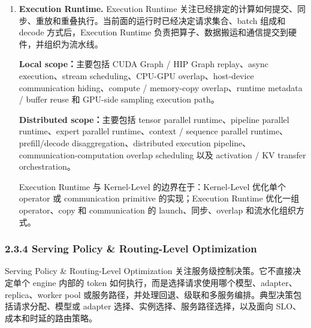 \begin{enumerate}
    \textbf{Distributed scope：}Decoding Runtime 会涉及 distributed verification、draft / target execution split、multi-draft execution、batched verification across workers、draft model 与 target model 分布式协同，以及 speculative decoding 与 prefill/decode disaggregation 的结合。

    Speculative decoding 有时也被称为 decoding algorithm。本文将其主要归入 Runtime-Level，因为它改变的是服务阶段的 token 生成与验证过程，而不是原模型参数或主体结构。如果某种 multi-token prediction 方法新增训练 head 或修改模型结构，则还应同时标注其 Model-Level 属性。

    \item \textbf{Execution Runtime.} Execution Runtime 关注已经排定的计算如何提交、同步、重放和重叠执行。当前面的运行时已经决定请求集合、batch 组成和 decode 方式后，Execution Runtime 负责把算子、数据搬运和通信提交到硬件，并组织为流水线。

    \textbf{Local scope：}主要包括 CUDA Graph / HIP Graph replay、async execution、stream scheduling、CPU-GPU overlap、host-device communication hiding、compute / memory-copy overlap、runtime metadata / buffer reuse 和 GPU-side sampling execution path。

    \textbf{Distributed scope：}主要包括 tensor parallel runtime、pipeline parallel runtime、expert parallel runtime、context / sequence parallel runtime、prefill/decode disaggregation、distributed execution pipeline、communication-computation overlap scheduling 以及 activation / KV transfer orchestration。

    Execution Runtime 与 Kernel-Level 的边界在于：Kernel-Level 优化单个 operator 或 communication primitive 的实现；Execution Runtime 优化一组 operator、copy 和 communication 的 launch、同步、overlap 和流水化组织方式。
\end{enumerate}

\subsubsection*{2.3.4 Serving Policy \& Routing-Level Optimization}

Serving Policy \& Routing-Level Optimization 关注服务级控制决策。它不直接决定单个 engine 内部的 token 如何执行，而是选择请求使用哪个模型、adapter、replica、worker pool 或服务路径，并处理回退、级联和多服务编排。典型决策包括请求分配、模型或 adapter 选择、实例选择、服务路径选择，以及面向 SLO、成本和时延的路由策略。

